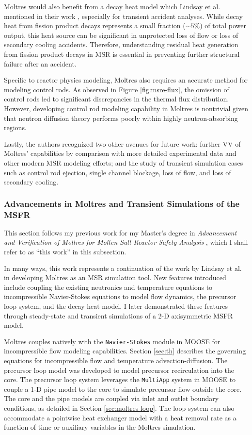 Moltres would also benefit from a decay heat model which Lindsay
et al. mentioned in their work \cite{lindsay_introduction_2018},
especially for transient accident analyses. While decay heat from fission
product decays represents a small fraction ($\sim5\%$) of total power output,
this heat source can be significant in unprotected loss of flow or loss of
secondary cooling accidents. Therefore, understanding residual heat generation
from fission product decays in \gls{MSR} is essential in preventing further
structural failure after an accident.

Specific to reactor physics modeling, Moltres also requires an accurate method for modeling
control rods. As observed in Figure \ref{fig:msre-flux}, the omission of control rods led to
significant discrepancies in the thermal flux distribution. However, developing control rod
modeling capability in Moltres is nontrivial given that neutron diffusion theory performs poorly
within highly neutron-absorbing regions.

Lastly, the authors recognized two other avenues for future work: further \gls{VV} of Moltres'
capabilities by comparison
with more detailed experimental data and other modern \gls{MSR} modeling
efforts; and the study of transient simulation cases such as control rod
ejection, single channel blockage, loss of flow, and loss of secondary cooling.

\subsubsection{Advancements in Moltres and Transient Simulations of the MSFR}
\label{sec:msfr}

This section follows my previous work for my Master's degree in \textit{Advancement and
Verification of Moltres for Molten Salt Reactor Safety Analysis} \cite{park_advancement_2020},
which I shall refer to as ``this work'' in this subsection.

In many ways, this work represents a continuation of the work by Lindsay et al.
\cite{lindsay_introduction_2018} in developing Moltres as an \gls{MSR}
simulation tool. New features introduced include coupling the existing
neutronics and temperature equations to incompressible Navier-Stokes equations
to model flow dynamics, the precursor loop system, and the decay heat model.
I later demonstrated these features through steady-state and transient
simulations of a 2-D axisymmetric \gls{MSFR} model.

Moltres couples natively with the \texttt{Navier-Stokes} module in \gls{MOOSE} for
incompressible flow modeling capabilities. Section \ref{sec:th} describes the governing equations
for incompressible flow and temperature advection-diffusion.
The precursor loop model was developed to model
precursor recirculation into the core. The precursor loop system leverages
the \texttt{MultiApp} system in \gls{MOOSE} to couple a 1-D pipe model to the
core to simulate precursor flow outside the core. The core and the pipe models
are coupled via inlet and outlet boundary conditions, as detailed in Section
\ref{sec:moltres-loop}. The loop system can also accommodate a pointwise heat
exchanger model with a heat removal rate as a function of time
or auxiliary variables in the Moltres simulation.

